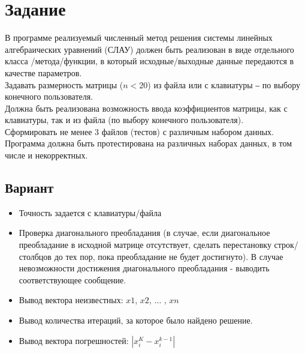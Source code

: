 \documentclass{article}
\begin{document}
\itmo[
      variant=13,
      labn=1,
      discipline=Вычислительная математика,
      group=P3212,
      student=Соколов Анатолий Владимирович,
      teacher=Наумова Надежда Александровна 
]
\lstset{language=rust}
\tableofcontents

\section{Задание}

В программе реализуемый численный метод решения системы линейных алгебраических уравнений (СЛАУ) должен быть реализован в виде отдельного класса /метода/функции, в который исходные/выходные данные передаются в качестве параметров.
\\
Задавать размерность матрицы ($n<20$) из файла или с клавиатуры ‒ по выбору конечного пользователя.
\\      
Должна быть реализована возможность ввода коэффициентов матрицы, как с клавиатуры, так и из файла (по выбору конечного пользователя).
\\
Сформировать не менее 3 файлов (тестов) с различным набором данных.
\\
Программа должна быть протестирована на различных наборах данных, в том числе и некорректных.

\subsection{Вариант}


\begin{center}
      \begin{itemize}
      \item Точность задается с клавиатуры/файла
      \item Проверка диагонального преобладания (в случае, если диагональное преобладание в исходной матрице отсутствует, сделать перестановку строк/столбцов до тех пор, пока преобладание не будет достигнуто). В случае невозможности достижения диагонального преобладания - выводить соответствующее сообщение.
      \item Вывод вектора неизвестных: $x1$, $x2$, $\dots$ , $xn$
      \item Вывод количества итераций, за которое было найдено решение.
      \item Вывод вектора погрешностей: $|x_i^K-x_i^{k-1}|$
      \end{itemize}
      \end{center}
\end{document}
